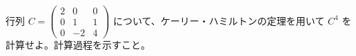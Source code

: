 
行列 $C = \begin{pmatrix} 2 & 0 & 0 \\ 0 & 1 & 1 \\ 0 & -2 & 4 \end{pmatrix}$ について、ケーリー・ハミルトンの定理を用いて $C^{4}$ を計算せよ。計算過程を示すこと。
